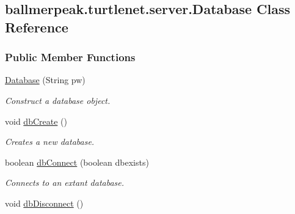 \hypertarget{classballmerpeak_1_1turtlenet_1_1server_1_1Database}{\subsection{ballmerpeak.\-turtlenet.\-server.\-Database Class Reference}
\label{classballmerpeak_1_1turtlenet_1_1server_1_1Database}
}
\subsubsection*{Public Member Functions}
\begin{DoxyCompactItemize}
\item 
\hyperlink{classballmerpeak_1_1turtlenet_1_1server_1_1Database_a2df6c740699204eafab513d8990f14a8}{Database} (String pw)
\begin{DoxyCompactList}\small\item\em Construct a database object. \end{DoxyCompactList}\item 
void \hyperlink{classballmerpeak_1_1turtlenet_1_1server_1_1Database_af796c23330bbae7271011b0e81901643}{db\-Create} ()
\begin{DoxyCompactList}\small\item\em Creates a new database. \end{DoxyCompactList}\item 
boolean \hyperlink{classballmerpeak_1_1turtlenet_1_1server_1_1Database_a80e93295b9fd81f2a3c73bcaa2df39ee}{db\-Connect} (boolean dbexists)
\begin{DoxyCompactList}\small\item\em Connects to an extant database. \end{DoxyCompactList}\item 
\hypertarget{classballmerpeak_1_1turtlenet_1_1server_1_1Database_a1900530bc7bf5c275a275b788086f6ec}{void \hyperlink{classballmerpeak_1_1turtlenet_1_1server_1_1Database_a1900530bc7bf5c275a275b788086f6ec}{db\-Disconnect} ()}\label{classballmerpeak_1_1turtlenet_1_1server_1_1Database_a1900530bc7bf5c275a275b788086f6ec}


\end{DoxyCompactItemize}
